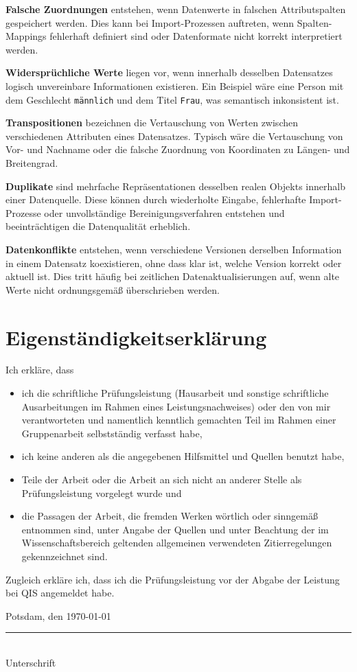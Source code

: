 \documentclass[
    a4paper,
    12pt,
    headinclude=true,
    BCOR=10mm,
]{scrreprt}
\begin{document}
\textbf{Falsche Zuordnungen} entstehen, wenn Datenwerte in falschen Attributspalten gespeichert werden. Dies kann bei Import-Prozessen auftreten, wenn Spalten-Mappings fehlerhaft definiert sind oder Datenformate nicht korrekt interpretiert werden.

\textbf{Widersprüchliche Werte} liegen vor, wenn innerhalb desselben Datensatzes logisch unvereinbare Informationen existieren. Ein Beispiel wäre eine Person mit dem Geschlecht \texttt{männlich} und dem Titel \texttt{Frau}, was semantisch inkonsistent ist.

\textbf{Transpositionen} bezeichnen die Vertauschung von Werten zwischen verschiedenen Attributen eines Datensatzes. Typisch wäre die Vertauschung von Vor- und Nachname oder die falsche Zuordnung von Koordinaten zu Längen- und Breitengrad.

\textbf{Duplikate} sind mehrfache Repräsentationen desselben realen Objekts innerhalb einer Datenquelle. Diese können durch wiederholte Eingabe, fehlerhafte Import-Prozesse oder unvollständige Bereinigungsverfahren entstehen und beeinträchtigen die Datenqualität erheblich.

\textbf{Datenkonflikte} entstehen, wenn verschiedene Versionen derselben Information in einem Datensatz koexistieren, ohne dass klar ist, welche Version korrekt oder aktuell ist. Dies tritt häufig bei zeitlichen Datenaktualisierungen auf, wenn alte Werte nicht ordnungsgemäß überschrieben werden.



\newpage
{}
\chapter*{Eigenständigkeitserklärung}
Ich erkläre, dass
\begin{itemize}
    \item ich die schriftliche Prüfungsleistung (Hausarbeit und sonstige schriftliche Ausarbeitungen im Rahmen eines Leistungsnachweises) oder den von mir verantworteten und namentlich kenntlich gemachten Teil im Rahmen einer Gruppenarbeit selbstständig verfasst habe,
    \item ich keine anderen als die angegebenen Hilfsmittel und Quellen benutzt habe,
    \item Teile der Arbeit oder die Arbeit an sich nicht an anderer Stelle als Prüfungsleistung vorgelegt wurde und
    \item die Passagen der Arbeit, die fremden Werken wörtlich oder sinngemäß entnommen sind, unter Angabe der Quellen und unter Beachtung der im Wissenschaftsbereich geltenden allgemeinen verwendeten Zitierregelungen gekennzeichnet sind.
\end{itemize}

Zugleich erkläre ich, dass ich die Prüfungsleistung vor der Abgabe der Leistung bei QIS angemeldet habe.

\vspace{2cm}

\noindent
Potsdam, den \today

\vspace{2cm}

\noindent
\rule{6cm}{0.4pt}\\
Unterschrift

\printbibliography
\newpage
\appendix
\end{document}
